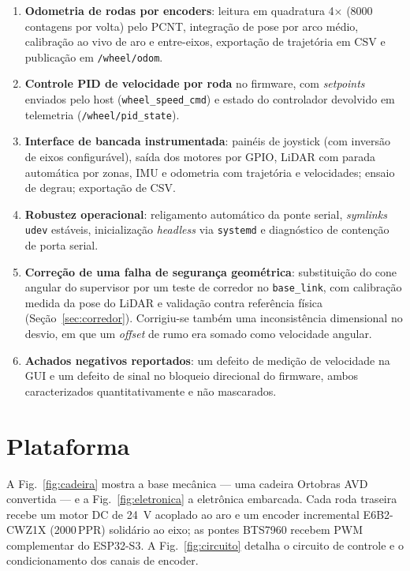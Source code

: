 \documentclass[conference]{IEEEtran}
\begin{document}
\begin{enumerate}
\item \textbf{Odometria de rodas por encoders}: leitura em quadratura 4$\times$
(\num{8000} contagens por volta) pelo PCNT, integração de pose por arco médio,
calibração ao vivo de aro e entre-eixos, exportação de trajetória em CSV e
publicação em \texttt{/wheel/odom}.

\item \textbf{Controle PID de velocidade por roda} no firmware, com
\emph{setpoints} enviados pelo host (\texttt{wheel\_speed\_cmd}) e estado do
controlador devolvido em telemetria (\texttt{/wheel/pid\_state}).

\item \textbf{Interface de bancada instrumentada}: painéis de joystick (com
inversão de eixos configurável), saída dos motores por GPIO, LiDAR com parada
automática por zonas, IMU e odometria com trajetória e velocidades; ensaio de
degrau; exportação de CSV.

\item \textbf{Robustez operacional}: religamento automático da ponte serial,
\emph{symlinks} \texttt{udev} estáveis, inicialização \emph{headless} via
\texttt{systemd} e diagnóstico de contenção de porta serial.

\item \textbf{Correção de uma falha de segurança geométrica}: substituição do
cone angular do supervisor por um teste de corredor no \texttt{base\_link}, com
calibração medida da pose do LiDAR e validação contra referência física
(Seção~\ref{sec:corredor}). Corrigiu-se também uma inconsistência dimensional no
desvio, em que um \emph{offset} de rumo era somado como velocidade angular.

\item \textbf{Achados negativos reportados}: um defeito de medição de velocidade
na GUI e um defeito de sinal no bloqueio direcional do firmware, ambos
caracterizados quantitativamente e não mascarados.
\end{enumerate}

\section{Plataforma}

A Fig.~\ref{fig:cadeira} mostra a base mecânica --- uma cadeira Ortobras AVD
convertida --- e a Fig.~\ref{fig:eletronica} a eletrônica embarcada. Cada roda
traseira recebe um motor DC de \SI{24}{\volt} acoplado ao aro e um encoder
incremental E6B2-CWZ1X (\num{2000}\,PPR) solidário ao eixo; as pontes BTS7960
recebem PWM complementar do ESP32-S3. A Fig.~\ref{fig:circuito} detalha o
circuito de controle e o condicionamento dos canais de encoder.
\end{document}
